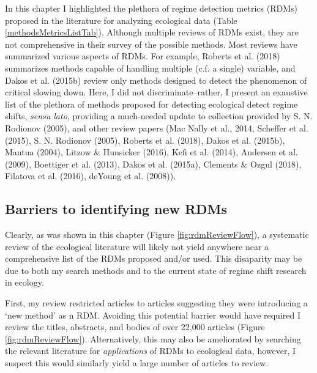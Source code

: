 \documentclass[12pt,twoside,openany]{reedthesis}
\begin{document}
In this chapter I highlighted the plethora of regime detection metrics
(RDMs) proposed in the literature for analyzing ecological data (Table
\ref{methodsMetricsListTab}). Although multiple reviews of RDMs exist,
they are not comprehensive in their survey of the possible methods. Most
reviews have summarized various aspects of RDMs. For example, Roberts et
al. (2018) summarizes methods capable of handling multiple (c.f. a
single) variable, and Dakos et al. (2015b) review only methods designed
to detect the phenomenon of critical slowing down. Here, I did not
discriminate--rather, I present an exaustive list of the plethora of
methods proposed for detecting ecological detect regime shifts,
\emph{sensu lato}, providing a much-needed update to collection provided
by S. N. Rodionov (2005), and other review papers (Mac Nally et al.,
2014, Scheffer et al. (2015), S. N. Rodionov (2005), Roberts et al.
(2018), Dakos et al. (2015b), Mantua (2004), Litzow \& Hunsicker (2016),
Kefi et al. (2014), Andersen et al. (2009), Boettiger et al. (2013),
Dakos et al. (2015a), Clements \& Ozgul (2018), Filatova et al. (2016),
deYoung et al. (2008)).

\subsection{Barriers to identifying new
RDMs}\label{barriers-to-identifying-new-rdms}

Clearly, as was shown in this chapter (Figure \ref{fig:rdmReviewFlow}),
a systematic review of the ecological literature will likely not yield
anywhere near a comprehensive list of the RDMs proposed and/or used.
This disaparity may be due to both my search methods and to the current
state of regime shift research in ecology.

First, my review restricted articles to articles suggesting they were
introducing a `new method' as n RDM. Avoiding this potential barrier
would have required I review the titles, abstracts, and bodies of over
22,000 articles (Figure \ref{fig:rdmReviewFlow}). Alternatively, this
may also be ameliorated by searching the relevant literature for
\emph{applications} of RDMs to ecological data, however, I suspect this
would similarly yield a large number of articles to review.
\end{document}
